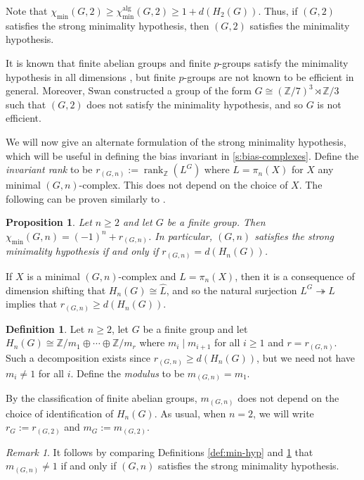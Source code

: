 \documentclass[11pt,a4paper,leqno]{amsart}
\newtheorem{proposition}[theorem]{Proposition}
\theoremstyle{definition}
\newtheorem{definition}[theorem]{Definition}
\theoremstyle{remark}
\newtheorem{remark}[theorem]{Remark}
\newcommand{\wh}{\widehat}
\newcommand{\cy}[1]{\Z/{#1}}
\newcommand{\Z}{\mathbb{Z}}
\DeclareMathOperator{\rank}{rank}
\DeclareMathOperator{\alg}{alg}
\begin{document}
Note that $\chi_{\min}(G,2) \geq \chi_{\min}^{\alg}(G,2) \geq 1 + d(H_2(G))$. Thus, if $(G,2)$ satisfies the strong minimality hypothesis, then $(G,2)$ satisfies the minimality hypothesis.

It is known that finite abelian groups and finite $p$-groups satisfy the minimality hypothesis in all dimensions \cite[Proposition 5]{Sieradski:1979}, but finite $p$-groups are not known to be efficient in general.  Moreover, Swan \cite[p196]{Swan:1965} constructed a group of the form $G \cong(\cy 7)^3 \rtimes  \cy 3$ such that $(G,2)$ does not satisfy the minimality hypothesis, and so $G$ is not efficient.

We will now give an alternate formulation of the strong minimality hypothesis, which will be useful in defining the bias invariant in \cref{s:bias-complexes}. Define the \textit{invariant rank} to be $r_{(G,n)} := \rank_{\Z}(L^G)$ where $L = \pi_n(X)$ for $X$ any minimal $(G,n)$-complex. This does not depend on the choice of $X$.
The following can be proven similarly to \cite[Proposition 4]{Sieradski:1979}.

\begin{proposition} \label{prop:min-hyp}
Let $n \ge 2$ and let $G$ be a finite group. Then $\chi_{\min}(G,n) = (-1)^n + r_{(G,n)}$. In particular, $(G,n)$ satisfies the strong minimality hypothesis if and only if $r_{(G,n)} = d(H_n(G))$.
\end{proposition}

If $X$ is a minimal $(G,n)$-complex and $L = \pi_n(X)$, then it is a consequence of dimension shifting that $H_n(G) \cong \wh L$,  and so the natural surjection $L^G \twoheadrightarrow \wh L$ implies that $r_{(G,n)} \ge d(H_n(G))$.

\begin{definition} \label{def:modulus}
Let $n \ge 2$, let $G$ be a finite group and let $H_n(G) \cong \Z/m_1 \oplus \cdots \oplus \Z/m_r$ where $m_i \mid m_{i+1}$ for all $i \ge 1$ and $r =r_{(G,n)}$. Such a decomposition exists since $r_{(G,n)} \ge d(H_n(G))$, but we need not have $m_i \ne 1$ for all $i$.
Define the \textit{modulus} to be $m_{(G,n)} = m_1$.
\end{definition}

By the classification of finite abelian groups, $m_{(G,n)}$ does not depend on the choice of identification of $H_n(G)$. As usual, when $n=2$, we will write $r_G := r_{(G,2)}$ and $m_G := m_{(G,2)}$.

\begin{remark} \label{remark:m=1}
It follows by comparing Definitions \ref{def:min-hyp} and \ref{def:modulus} that 	$m_{(G,n)} \ne 1$ if and only if $(G,n)$ satisfies the strong minimality hypothesis.
\end{remark}
\end{document}
